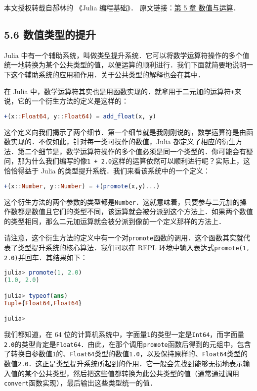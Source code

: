 
本文授权转载自郝林的 《Julia 编程基础》． 原文链接：\href{https://github.com/hyper0x/JuliaBasics/blob/master/book/ch05.md}{第 5 章 数值与运算}．


\subsection{5.6 数值类型的提升}

Julia 中有一个辅助系统，叫做类型提升系统．它可以将数学运算符操作的多个值统一地转换为某个公共类型的值，以便运算的顺利进行．我们下面就简要地说明一下这个辅助系统的应用和作用．关于公共类型的解释也会在其中．

在 Julia 中，数学运算符其实也是用函数实现的．就拿用于二元加的运算符\verb|+|来说，它的一个衍生方法的定义是这样的：
\begin{lstlisting}[language=julia]
+(x::Float64, y::Float64) = add_float(x, y)
\end{lstlisting}

这个定义向我们揭示了两个细节．第一个细节就是我刚刚说的，数学运算符是由函数实现的．不仅如此，针对每一类可操作的数值，Julia 都定义了相应的衍生方法．第二个细节是，数学运算符操作的多个值必须是同一个类型的．你可能会有疑问，那为什么我们编写的像\verb|1 + 2.0|这样的运算依然可以顺利进行呢？实际上，这恰恰得益于 Julia 的类型提升系统．我们来看该系统中的一个定义：
\begin{lstlisting}[language=julia]
+(x::Number, y::Number) = +(promote(x,y)...)
\end{lstlisting}

这个衍生方法的两个参数的类型都是\verb|Number|．这就意味着，只要参与二元加的操作数都是数值且它们的类型不同，该运算就会被分派到这个方法上．如果两个数值的类型相同，那么二元加运算就会被分派到像前一个定义那样的方法上．

请注意，这个衍生方法的定义中有一个对\verb|promote|函数的调用．这个函数其实就代表了类型提升系统的核心算法．我们可以在 REPL 环境中输入表达式\verb|promote(1, 2.0)|并回车．其结果如下：
\begin{lstlisting}[language=julia]
julia> promote(1, 2.0)
(1.0, 2.0)

julia> typeof(ans)
Tuple{Float64,Float64}

julia> 
\end{lstlisting}

我们都知道，在 64 位的计算机系统中，字面量\verb|1|的类型一定是\verb|Int64|，而字面量\verb|2.0|的类型肯定是\verb|Float64|．由此，在那个调用\verb|promote|函数后得到的元组中，包含了转换自参数值\verb|1|的、\verb|Float64|类型的数值\verb|1.0|，以及保持原样的、\verb|Float64|类型的数值\verb|2.0|．这正是类型提升系统所起到的作用．它一般会先找到能够无损地表示输入值的某个公共类型，然后把这些值都转换为此公共类型的值（通常通过调用\verb|convert|函数实现），最后输出这些类型统一的值．

